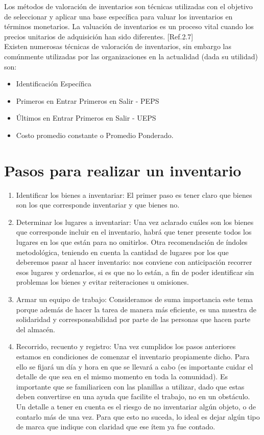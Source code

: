 Los métodos de valoración de inventarios son técnicas utilizadas con el objetivo de seleccionar y aplicar una base específica para valuar los inventarios en términos monetarios. La valuación de inventarios es un proceso vital cuando los precios unitarios de adquisición han sido diferentes. [Ref.2.7]\\

Existen numerosas técnicas de valoración de inventarios, sin embargo las comúnmente utilizadas por las organizaciones en la actualidad (dada su utilidad) son:

\begin{itemize}
\item Identificación Específica 
\item Primeros en Entrar Primeros en Salir - PEPS
\item Últimos en Entrar Primeros en Salir - UEPS
\item Costo promedio constante o Promedio Ponderado.
\end{itemize}
\section{Pasos para realizar un inventario}
\begin{enumerate}
\item Identificar los bienes a inventariar: El primer paso es tener claro que bienes son los que corresponde inventariar y que bienes no.
\item Determinar los lugares a inventariar: Una vez aclarado cuáles son los bienes que corresponde incluir en el inventario, habrá que tener presente todos los lugares en los que están para no omitirlos. Otra recomendación de índoles metodológica, teniendo en cuenta la cantidad de lugares por los que deberemos pasar al hacer inventario: nos conviene con anticipación recorrer esos lugares y ordenarlos, si es que no lo están, a fin de poder identificar sin problemas los bienes y evitar reiteraciones u omisiones.
\item Armar un equipo de trabajo: Consideramos de suma importancia este tema porque además de hacer la tarea de manera más eficiente, es una muestra de solidaridad y corresponsabilidad por parte de las personas que hacen parte del almacén.
\item Recorrido, recuento y registro: Una vez cumplidos los pasos anteriores estamos en condiciones de comenzar el inventario propiamente dicho. Para ello se fijará un día y hora en que se llevará a cabo (es importante cuidar el detalle de que sea en el mismo momento en toda la comunidad). Es importante que se familiaricen con las planillas a utilizar, dado que estas deben convertirse en una ayuda que facilite el trabajo, no en un obstáculo. Un detalle a tener en cuenta es el riesgo de no inventariar algún objeto, o de contarlo más de una vez. Para que esto no suceda, lo ideal es dejar algún tipo de marca que indique con claridad que ese ítem ya fue contado.
\end{enumerate}

